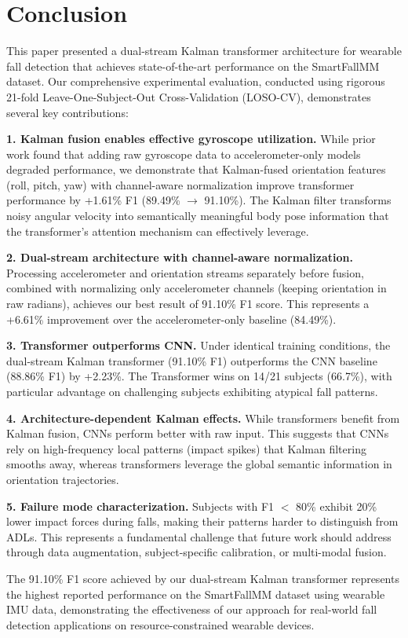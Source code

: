 \section{Conclusion}
\label{sec:conclusion}

This paper presented a dual-stream Kalman transformer architecture for wearable fall detection that achieves state-of-the-art performance on the SmartFallMM dataset. Our comprehensive experimental evaluation, conducted using rigorous 21-fold Leave-One-Subject-Out Cross-Validation (LOSO-CV), demonstrates several key contributions:

\textbf{1. Kalman fusion enables effective gyroscope utilization.} While prior work found that adding raw gyroscope data to accelerometer-only models degraded performance, we demonstrate that Kalman-fused orientation features (roll, pitch, yaw) with channel-aware normalization improve transformer performance by +1.61\% F1 (89.49\% $\rightarrow$ 91.10\%). The Kalman filter transforms noisy angular velocity into semantically meaningful body pose information that the transformer's attention mechanism can effectively leverage.

\textbf{2. Dual-stream architecture with channel-aware normalization.} Processing accelerometer and orientation streams separately before fusion, combined with normalizing only accelerometer channels (keeping orientation in raw radians), achieves our best result of 91.10\% F1 score. This represents a +6.61\% improvement over the accelerometer-only baseline (84.49\%).

\textbf{3. Transformer outperforms CNN.} Under identical training conditions, the dual-stream Kalman transformer (91.10\% F1) outperforms the CNN baseline (88.86\% F1) by +2.23\%. The Transformer wins on 14/21 subjects (66.7\%), with particular advantage on challenging subjects exhibiting atypical fall patterns.

\textbf{4. Architecture-dependent Kalman effects.} While transformers benefit from Kalman fusion, CNNs perform better with raw input. This suggests that CNNs rely on high-frequency local patterns (impact spikes) that Kalman filtering smooths away, whereas transformers leverage the global semantic information in orientation trajectories.

\textbf{5. Failure mode characterization.} Subjects with F1 $<$ 80\% exhibit 20\% lower impact forces during falls, making their patterns harder to distinguish from ADLs. This represents a fundamental challenge that future work should address through data augmentation, subject-specific calibration, or multi-modal fusion.

The 91.10\% F1 score achieved by our dual-stream Kalman transformer represents the highest reported performance on the SmartFallMM dataset using wearable IMU data, demonstrating the effectiveness of our approach for real-world fall detection applications on resource-constrained wearable devices.
